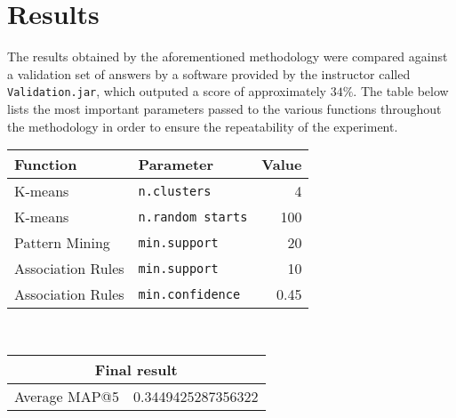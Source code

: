\documentclass[11pt]{article}
\begin{document}
\section{Results}
The results obtained by the aforementioned methodology were compared against a validation set of answers by a software provided by the instructor called \texttt{Validation.jar}, which outputed a score of approximately $34\%$. The table below lists the most important parameters passed to the various functions throughout the methodology in order to ensure the repeatability of the experiment.
\\
  \begin{center}
    \begin{tabular}{llr}
      \toprule
      Function & Parameter & Value\\
      \midrule
      K-means & \texttt{n.clusters} & 4\\
      K-means & \texttt{n.random starts} & 100\\
      Pattern Mining & \texttt{min.support} & 20\\
      Association Rules & \texttt{min.support} & 10\\
      Association Rules & \texttt{min.confidence} & 0.45\\
      \bottomrule
    \end{tabular}
    \\
    \begin{tabular}{cc}
    \toprule
    \multicolumn{2}{c}{Final result}\\
    \midrule
    Average MAP@5 & 0.3449425287356322\\
    \bottomrule
    \end{tabular}
  \end{center}





\end{document}
